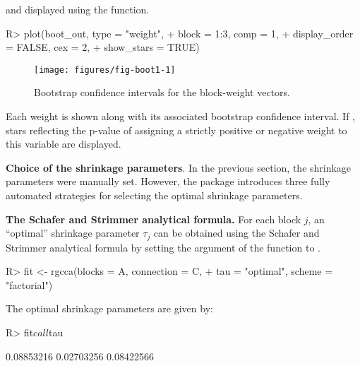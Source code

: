 \documentclass[
]{jss}
\begin{document}
\normalsize

and displayed using the  function.

\footnotesize

\begin{CodeChunk}
\begin{CodeInput}
R> plot(boot_out, type = "weight", 
+      block = 1:3, comp = 1, 
+      display_order = FALSE, cex = 2,
+      show_stars = TRUE)
\end{CodeInput}
\begin{figure}[H]

{\centering \texttt{[image: figures/fig-boot1-1]} 

}

\caption[Bootstrap confidence intervals for the block-weight vectors]{Bootstrap confidence intervals for the block-weight vectors.}\label{fig:fig-boot1}
\end{figure}
\end{CodeChunk}

\normalsize

Each weight is shown along with its associated bootstrap confidence
interval. If , stars reflecting the p-value of
assigning a strictly positive or negative weight to this variable are
displayed.

\textbf{Choice of the shrinkage parameters}. In the previous section,
the shrinkage parameters were manually set. However, the 
package introduces three fully automated strategies for selecting the
optimal shrinkage parameters.

\textbf{The Schafer and Strimmer analytical formula.} For each block
\(j\), an ``optimal'' shrinkage parameter \(\tau_j\) can be obtained
using the Schafer and Strimmer analytical formula \citep{Schafer2005} by
setting the  argument of the  function to
.

\footnotesize

\begin{CodeChunk}
\begin{CodeInput}
R> fit <- rgcca(blocks = A, connection = C,
+              tau = "optimal", scheme = "factorial")
\end{CodeInput}
\end{CodeChunk}

\normalsize

The optimal shrinkage parameters are given by:

\footnotesize

\begin{CodeChunk}
\begin{CodeInput}
R> fit$call$tau
\end{CodeInput}
\begin{CodeOutput}
[1] 0.08853216 0.02703256 0.08422566
\end{CodeOutput}
\end{CodeChunk}
\end{document}
